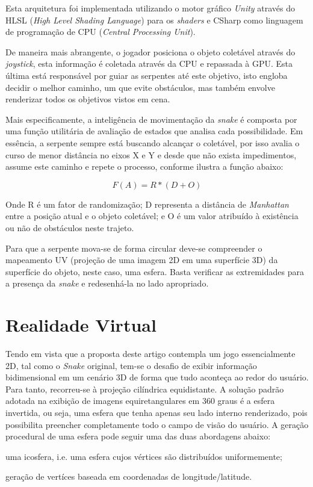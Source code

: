 \documentclass[conference]{IEEEtran}
\begin{document}
Esta arquitetura foi implementada utilizando o motor gráfico \textit{Unity} através do HLSL (\textit{High Level Shading Language}) para os \textit{shaders} e CSharp como linguagem de programação de CPU (\textit{Central Processing Unit}).

De maneira mais abrangente, o jogador posiciona o objeto coletável através do \textit{joystick}, esta informação é coletada através da CPU e repassada à GPU. Esta última está responsável por guiar as serpentes até este objetivo, isto engloba decidir o melhor caminho, um que evite obstáculos, mas também envolve renderizar todos os objetivos vistos em cena.

Mais especificamente, a inteligência de movimentação da \textit{snake} é composta por uma função utilitária de avaliação de estados que analisa cada possibilidade. Em essência, a serpente sempre está buscando alcançar o coletável, por isso avalia o curso de menor distância no eixos X e Y e desde que não exista impedimentos, assume este caminho e repete o processo, conforme ilustra a função abaixo:

\begin{equation}
F(A) = R * (D + O)
\label{equation11}
\end{equation}

Onde R é um fator de randomização; D representa a distância de \textit{Manhattan} entre a posição atual e o objeto coletável; e O é um valor atribuído à existência ou não de obstáculos neste trajeto.

Para que a serpente mova-se de forma circular deve-se compreender o mapeamento UV (projeção de uma imagem 2D em uma superfície 3D) da superfície do objeto, neste caso, uma esfera. Basta verificar as extremidades para a presença da \textit{snake} e redesenhá-la no lado apropriado.

\section{Realidade Virtual}
Tendo em vista que a proposta deste artigo contempla um jogo essencialmente 2D, tal como o \textit{Snake} original, tem-se o desafio de exibir informação bidimensional em um cenário 3D de forma que tudo aconteça ao redor do usuário. Para tanto, recorreu-se à projeção cilíndrica equidistante. A solução padrão adotada na exibição de imagens equiretangulares em 360 graus é a esfera invertida, ou seja, uma esfera que tenha apenas seu lado interno renderizado, pois possibilita preencher completamente todo o campo de visão do usuário. A geração procedural de uma esfera pode seguir uma das duas abordagens abaixo:
\begin{enumerate}
  \begin{item} uma icosfera, i.e. uma esfera cujos vértices são distribuídos uniformemente; \end{item}
  \begin{item} geração de vertíces baseada em coordenadas de longitude/latitude. \end{item}
\end{enumerate}
\end{document}
